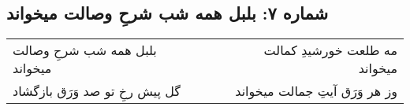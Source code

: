 \begin{center}
\section*{شماره ۷: بلبل همه شب شرحِ وصالت میخواند}
\label{sec:007}
\begin{longtable}{l p{0.5cm} r}
بلبل همه شب شرحِ وصالت میخواند
&&
مه طلعت خورشیدِ کمالت میخواند
\\
گل پیش رخِ تو صد وَرَق بازگشاد
&&
وز هر وَرَق آیتِ جمالت میخواند
\\
\end{longtable}
\end{center}

